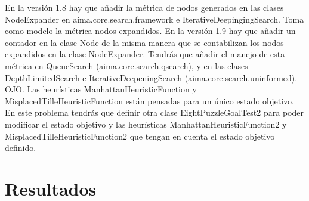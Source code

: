 \documentclass{article}
\begin{document}
En la versión 1.8 hay que añadir la métrica de nodos generados en las clases NodeExpander en aima.core.search.framework e IterativeDeepingingSearch. Toma como modelo la métrica nodos expandidos.
En la versión 1.9 hay que añadir un contador en la clase Node de la misma manera que se contabilizan los nodos expandidos en la clase NodeExpander. Tendrás que añadir el manejo de esta métrica en QueueSearch (aima.core.search.qsearch), y en las clases DepthLimitedSearch e IterativeDeepeningSearch (aima.core.search.uninformed).
OJO. Las heurísticas ManhattanHeuristicFunction y MisplacedTilleHeuristicFunction están pensadas para un único estado objetivo. En este problema tendrás que definir otra clase EightPuzzleGoalTest2 para poder modificar el estado objetivo y las heurísticas ManhattanHeuristicFunction2 y MisplacedTilleHeuristicFunction2 que tengan en cuenta el estado objetivo definido.


\section{Resultados}
\end{document}
